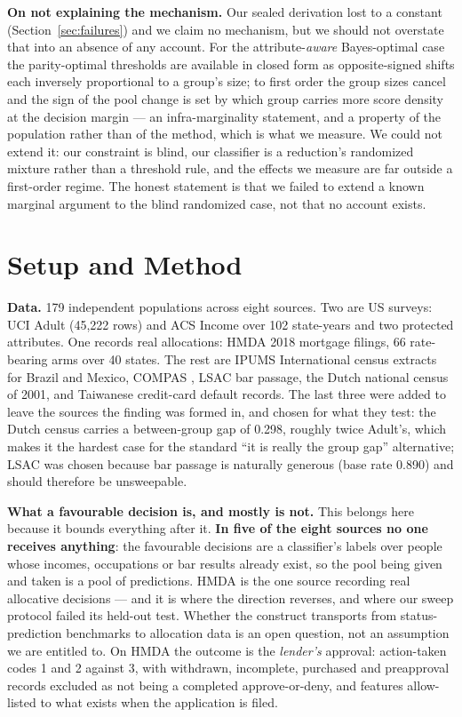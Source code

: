 \documentclass[conference]{IEEEtran}
\begin{document}
\textbf{On not explaining the mechanism.} Our sealed derivation lost to a constant
(Section~\ref{sec:failures}) and we claim no mechanism, but we should not overstate that into
an absence of any account. For the attribute-\emph{aware} Bayes-optimal case the
parity-optimal thresholds are available in closed form \cite{zeng2022} as opposite-signed
shifts each inversely proportional to a group's size; to first order the group sizes cancel
and the sign of the pool change is set by which group carries more score density at the
decision margin --- an infra-marginality statement, and a property of the population rather
than of the method, which is what we measure. We could not extend it: our constraint is blind,
our classifier is a reduction's randomized mixture rather than a threshold rule, and the
effects we measure are far outside a first-order regime. The honest statement is that we
failed to extend a known marginal argument to the blind randomized case, not that no account
exists.



\section{Setup and Method}
\label{sec:setup}

\textbf{Data.} 179 independent populations across eight sources. Two are US surveys: UCI Adult
(45{,}222 rows) and ACS Income \cite{ding2021} over 102 state-years and two protected
attributes. One records real allocations: HMDA 2018 mortgage filings, 66 rate-bearing arms
over 40 states. The rest are IPUMS International census extracts for Brazil and Mexico, COMPAS
\cite{propublica2016}, LSAC bar passage, the Dutch national census of 2001, and Taiwanese
credit-card default records. The last three were added to leave the sources the finding was
formed in, and chosen for what they test: the Dutch census carries a between-group gap of
0.298, roughly twice Adult's, which makes it the hardest case for the standard ``it is really
the group gap'' alternative; LSAC was chosen because bar passage is naturally generous (base
rate 0.890) and should therefore be unsweepable.

\textbf{What a favourable decision is, and mostly is not.} This belongs here because it bounds
everything after it. \textbf{In five of the eight sources no one receives anything}: the
favourable decisions are a classifier's labels over people whose incomes, occupations or bar
results already exist, so the pool being given and taken is a pool of predictions. HMDA is the
one source recording real allocative decisions --- and it is where the direction reverses, and
where our sweep protocol failed its held-out test. Whether the construct transports from
status-prediction benchmarks to allocation data is an open question, not an assumption we are
entitled to. On HMDA the outcome is the \emph{lender's} approval: action-taken codes 1 and 2
against 3, with withdrawn, incomplete, purchased and preapproval records excluded as not being
a completed approve-or-deny, and features allow-listed to what exists when the application is
filed.
\end{document}
